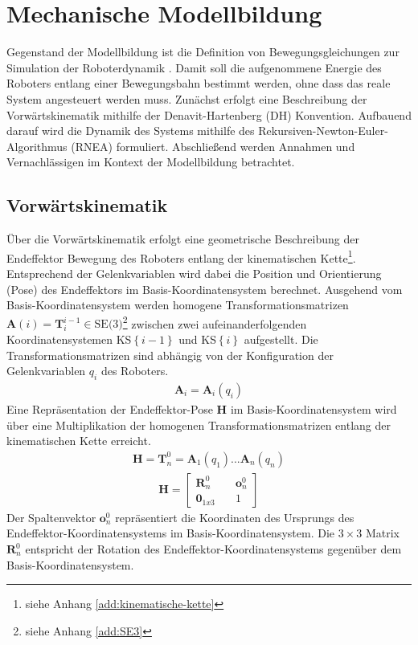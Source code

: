 \chapter{Mechanische Modellbildung}
\label{cha:Modellbildung}
Gegenstand der Modellbildung ist die Definition von Bewegungsgleichungen zur Simulation der Roboterdynamik \cite[S.~247]{Grimble.2009}. Damit soll die aufgenommene Energie des Roboters entlang einer Bewegungsbahn bestimmt werden, ohne dass das reale System angesteuert werden muss. Zunächst erfolgt eine Beschreibung der Vorwärtskinematik mithilfe der Denavit-Hartenberg (DH) Konvention. Aufbauend darauf wird die Dynamik des Systems mithilfe des Rekursiven-Newton-Euler-Algorithmus (RNEA) formuliert.  Abschließend werden Annahmen und Vernachlässigen im Kontext der Modellbildung betrachtet.

\section{Vorwärtskinematik}
Über die Vorwärtskinematik erfolgt eine geometrische Beschreibung der Endeffektor Bewegung des Roboters entlang der kinematischen Kette\footnote{siehe Anhang \ref{add:kinematische-kette}}. Entsprechend der Gelenkvariablen wird dabei die Position und Orientierung (Pose) des Endeffektors im Basis-Koordinatensystem berechnet. Ausgehend vom Basis-Koordinatensystem werden homogene Transformationsmatrizen $\bm{A}(i) = \bm{T}^{i-1}_i \in \text{SE(3)}$\footnote{siehe Anhang \ref{add:SE3}} zwischen zwei aufeinanderfolgenden Koordinatensystemen KS$\left\{i-1\right\}$ und KS$\left\{i\right\}$ aufgestellt. Die Transformationsmatrizen sind abhängig von der Konfiguration der Gelenkvariablen $q_i$ des Roboters. 
\begin{align}
	\bm{A}_i = \bm{A}_i(q_i) 
\end{align}
Eine Repräsentation der Endeffektor-Pose $\bm{H}$ im Basis-Koordinatensystem wird über eine Multiplikation der homogenen Transformationsmatrizen entlang der kinematischen Kette erreicht. 
\begin{align}
	\label{eqn:homogeneTransformation}
	\bm{H} = \bm{T}^0_n = \bm{A}_1(q_1) ... \bm{A}_n(q_n)
\end{align}
\begin{align}
	\bm{H} =\begin{bmatrix} \bm{R}^0_n &\quad \bm{o}^0_n\\ \mathbf{0}_{1x3} &\quad 1\end{bmatrix}
\end{align}
Der Spaltenvektor $\bm{o}^0_n$ repräsentiert die Koordinaten des Ursprungs des Endeffektor-Koordinatensystems im Basis-Koordinatensystem. Die $3 \times 3 $ Matrix $\bm{R}^0_n$ entspricht der Rotation des Endeffektor-Koordinatensystems gegenüber dem Basis-Koordinatensystem. \cite[S.~75~ff.]{Spong.2020} 
